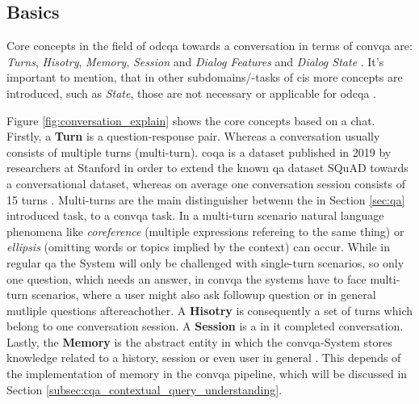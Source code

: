 \subsection{Basics}
\label{subsec:cqa_basics}

Core concepts in the field of \gls{odcqa} towards a conversation in terms of \gls{convqa} are: \textit{Turns}, \textit{Hisotry}, \textit{Memory}, \textit{Session} and \textit{Dialog Features} and \textit{Dialog State} \cite{zamani_conversational_2023}. It's important to mention, that in other subdomains/-tasks of \gls{cis} more concepts are introduced, such as \textit{State}, those are not necessary or applicable for \gls{odcqa} \cite{zaib_conversational_2021}.

Figure \ref{fig:conversation_explain} shows the core concepts based on a chat. Firstly, a \textbf{Turn} is a question-response pair. Whereas a conversation usually consists of multiple turns (multi-turn). \gls{coqa} is a dataset published in 2019 by researchers at Stanford in order to extend the known \gls{qa} dataset SQuAD towards a conversational dataset, whereas on average one conversation session consists of 15 turns \cite{reddy_coqa_2018}. Multi-turns are the main distinguisher betwenn the in Section \ref{sec:qa} introduced task, to a \gls{convqa} task. In a multi-turn scenario natural language phenomena like \textit{coreference} (multiple expressions refereing to the same thing) or \textit{ellipsis} (omitting words or topics implied by the context) can occur. While in regular \gls{qa} the System will only be challenged with single-turn scenarios, so only one question, which needs an answer, in \gls{convqa} the systems have to face multi-turn scenarios, where a user might also ask followup question or in general mutliple questions aftereachother. A \textbf{Hisotry} is consequently a set of turns which belong to one conversation session. A \textbf{Session} is a in it completed conversation. Lastly, the \textbf{Memory} is the abstract entity in which the \gls{convqa}-System stores knowledge related to a history, session or even user in general \cite{zamani_conversational_2023,gao_neural_2022}. This depends of the implementation of memory in the \gls{convqa} pipeline, which will be discussed in Section \ref{subsec:cqa_contextual_query_understanding}.

